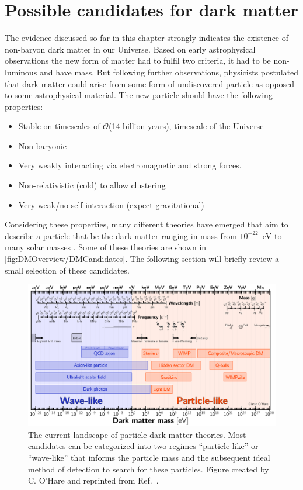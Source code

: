 \section{Possible candidates for dark matter}\label{sec:DMOverview/Candidates4DM}
The evidence discussed so far in this chapter strongly indicates the existence of non-baryon dark matter in our Universe. Based on early astrophysical observations the new form of matter had to fulfil two criteria, it had to be non-luminous and have mass. But following further observations, physicists postulated that dark matter could arise from some form of undiscovered particle as opposed to some astrophysical material. The new particle should have the following properties:
\begin{itemize}
    \item Stable on timescales of $\mathcal{O}$(14 billion years), timescale of the Universe
    \item Non-baryonic
    \item Very weakly interacting via electromagnetic and strong forces.
    \item Non-relativistic (cold) to allow clustering
    \item Very weak/no self interaction (expect gravitational)
\end{itemize}
Considering these properties, many different theories have emerged that aim to describe a particle that be the dark matter ranging in mass from $10^{-22}$~eV to many solar masses \cite{DMPrimer}. Some of these theories are shown in \autoref{fig:DMOverview/DMCandidates}. The following section will briefly review a small selection of these candidates.

\begin{figure}[h!]
    \centering
    \includegraphics[width=\linewidth]{figures/DMOverview/Dark_matter_candidates.pdf}
    \caption[The current landscape of particle dark matter theories.]{The current landscape of particle dark matter theories. Most candidates can be categorized into two regimes ``particle-like'' or  ``wave-like'' that informs the particle mass and the subsequent ideal method of detection to search for these particles. Figure created by C. O'Hare and reprinted from Ref.~\cite{mwilliams:thesis}.}
    \label{fig:DMOverview/DMCandidates}
\end{figure}

